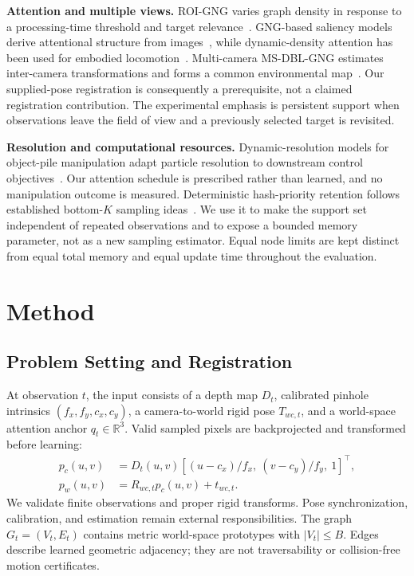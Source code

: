 \documentclass[letterpaper,10pt,conference]{template/ieeeconf}
\newcommand{\R}{\mathbb{R}}
\begin{document}
\textbf{Attention and multiple views.} ROI-GNG varies graph density in response to a processing-time threshold and target relevance~\cite{toda2019roi}. GNG-based saliency models derive attentional structure from images~\cite{tunnermann2019saliency}, while dynamic-density attention has been used for embodied locomotion~\cite{saputra2023attention}. Multi-camera MS-DBL-GNG estimates inter-camera transformations and forms a common environmental map~\cite{siow2024multicamera}. Our supplied-pose registration is consequently a prerequisite, not a claimed registration contribution. The experimental emphasis is persistent support when observations leave the field of view and a previously selected target is revisited.

\textbf{Resolution and computational resources.} Dynamic-resolution models for object-pile manipulation adapt particle resolution to downstream control objectives~\cite{wang2023dynamic}. Our attention schedule is prescribed rather than learned, and no manipulation outcome is measured. Deterministic hash-priority retention follows established bottom-$K$ sampling ideas~\cite{thorup2013bottomk}. We use it to make the support set independent of repeated observations and to expose a bounded memory parameter, not as a new sampling estimator. Equal node limits are kept distinct from equal total memory and equal update time throughout the evaluation.

\section{Method}
\subsection{Problem Setting and Registration}
At observation $t$, the input consists of a depth map $D_t$, calibrated pinhole intrinsics $(f_x,f_y,c_x,c_y)$, a camera-to-world rigid pose $T_{wc,t}$, and a world-space attention anchor $q_t\in\R^3$. Valid sampled pixels are backprojected and transformed before learning:
\begin{align}
 p_c(u,v)&=D_t(u,v)\left[(u-c_x)/f_x,\ (v-c_y)/f_y,\ 1\right]^\top,\\
 p_w(u,v)&=R_{wc,t}p_c(u,v)+t_{wc,t}.
\end{align}
We validate finite observations and proper rigid transforms. Pose synchronization, calibration, and estimation remain external responsibilities. The graph $G_t=(V_t,E_t)$ contains metric world-space prototypes with $|V_t|\leq B$. Edges describe learned geometric adjacency; they are not traversability or collision-free motion certificates.
\end{document}
